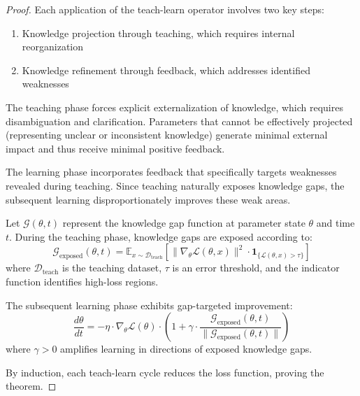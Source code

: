 \begin{proof}
Each application of the teach-learn operator involves two key steps:
\begin{enumerate}
    \item Knowledge projection through teaching, which requires internal reorganization
    \item Knowledge refinement through feedback, which addresses identified weaknesses
\end{enumerate}

The teaching phase forces explicit externalization of knowledge, which requires disambiguation and clarification. Parameters that cannot be effectively projected (representing unclear or inconsistent knowledge) generate minimal external impact and thus receive minimal positive feedback.

The learning phase incorporates feedback that specifically targets weaknesses revealed during teaching. Since teaching naturally exposes knowledge gaps, the subsequent learning disproportionately improves these weak areas.

\begin{theorem}
Let $\mathcal{G}(\theta, t)$ represent the knowledge gap function at parameter state $\theta$ and time $t$. During the teaching phase, knowledge gaps are exposed according to:
\begin{equation}
\mathcal{G}_{\text{exposed}}(\theta, t) = \mathbb{E}_{x \sim \mathcal{D}_{\text{teach}}} \left[\|\nabla_{\theta} \mathcal{L}(\theta, x)\|^2 \cdot \mathbf{1}_{\{\mathcal{L}(\theta, x) > \tau\}}\right]
\end{equation}
where $\mathcal{D}_{\text{teach}}$ is the teaching dataset, $\tau$ is an error threshold, and the indicator function identifies high-loss regions.

The subsequent learning phase exhibits gap-targeted improvement:
\begin{equation}
\frac{d\theta}{dt} = -\eta \cdot \nabla_{\theta} \mathcal{L}(\theta) \cdot \left(1 + \gamma \cdot \frac{\mathcal{G}_{\text{exposed}}(\theta, t)}{\|\mathcal{G}_{\text{exposed}}(\theta, t)\|}\right)
\end{equation}
where $\gamma > 0$ amplifies learning in directions of exposed knowledge gaps.
\end{theorem}

By induction, each teach-learn cycle reduces the loss function, proving the theorem.
\end{proof}

